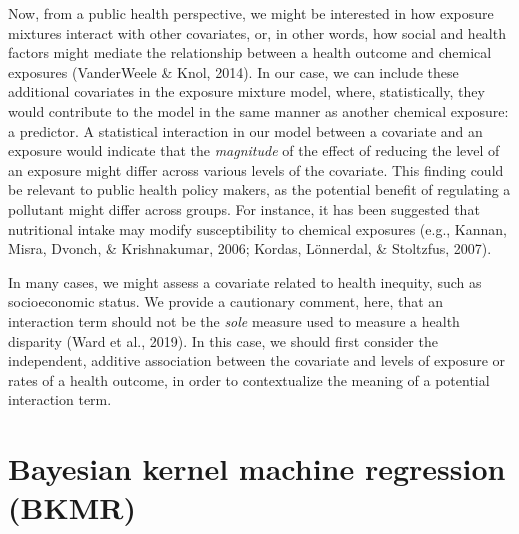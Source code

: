 \documentclass[12pt, twoside]{amherstthesis}
\begin{document}
Now, from a public health perspective, we might be interested in how exposure mixtures interact with other covariates, or, in other words, how social and health factors might mediate the relationship between a health outcome and chemical exposures (VanderWeele \& Knol, 2014). In our case, we can include these additional covariates in the exposure mixture model, where, statistically, they would contribute to the model in the same manner as another chemical exposure: a predictor. A statistical interaction in our model between a covariate and an exposure would indicate that the \emph{magnitude} of the effect of reducing the level of an exposure might differ across various levels of the covariate. This finding could be relevant to public health policy makers, as the potential benefit of regulating a pollutant might differ across groups. For instance, it has been suggested that nutritional intake may modify susceptibility to chemical exposures (e.g., Kannan, Misra, Dvonch, \& Krishnakumar, 2006; Kordas, Lönnerdal, \& Stoltzfus, 2007).

In many cases, we might assess a covariate related to health inequity, such as socioeconomic status. We provide a cautionary comment, here, that an interaction term should not be the \emph{sole} measure used to measure a health disparity (Ward et al., 2019). In this case, we should first consider the independent, additive association between the covariate and levels of exposure or rates of a health outcome, in order to contextualize the meaning of a potential interaction term.

\hypertarget{bkmr}{%
\section{Bayesian kernel machine regression (BKMR)}\label{bkmr}}
\end{document}
